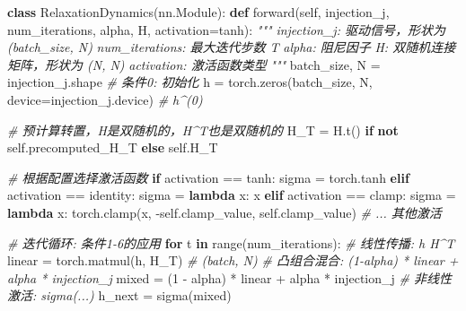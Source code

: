 \documentclass[
  12pt,
]{article}
\newenvironment{Shaded}{}{}
\newcommand{\BuiltInTok}[1]{#1}
\newcommand{\CommentTok}[1]{\textcolor[rgb]{0.38,0.63,0.69}{\textit{#1}}}
\newcommand{\ControlFlowTok}[1]{\textcolor[rgb]{0.00,0.44,0.13}{\textbf{#1}}}
\newcommand{\DecValTok}[1]{\textcolor[rgb]{0.25,0.63,0.44}{#1}}
\newcommand{\KeywordTok}[1]{\textcolor[rgb]{0.00,0.44,0.13}{\textbf{#1}}}
\newcommand{\NormalTok}[1]{#1}
\newcommand{\OperatorTok}[1]{\textcolor[rgb]{0.40,0.40,0.40}{#1}}
\newcommand{\StringTok}[1]{\textcolor[rgb]{0.25,0.44,0.63}{#1}}
\newcommand{\VariableTok}[1]{\textcolor[rgb]{0.10,0.09,0.49}{#1}}
\begin{document}
\begin{Shaded}
\begin{Highlighting}[]
\KeywordTok{class}\NormalTok{ RelaxationDynamics(nn.Module):}
    \KeywordTok{def}\NormalTok{ forward(}\VariableTok{self}\NormalTok{, injection\_j, num\_iterations, alpha, H, activation}\OperatorTok{=}\StringTok{\textquotesingle{}tanh\textquotesingle{}}\NormalTok{):}
        \CommentTok{"""}
\CommentTok{        injection\_j: 驱动信号，形状为 (batch\_size, N)}
\CommentTok{        num\_iterations: 最大迭代步数 T}
\CommentTok{        alpha: 阻尼因子}
\CommentTok{        H: 双随机连接矩阵，形状为 (N, N)}
\CommentTok{        activation: 激活函数类型}
\CommentTok{        """}
\NormalTok{        batch\_size, N }\OperatorTok{=}\NormalTok{ injection\_j.shape}
        \CommentTok{\# 条件0: 初始化}
\NormalTok{        h }\OperatorTok{=}\NormalTok{ torch.zeros(batch\_size, N, device}\OperatorTok{=}\NormalTok{injection\_j.device) }\CommentTok{\# h\^{}(0)}
        
        \CommentTok{\# 预计算转置，H是双随机的，H\^{}T也是双随机的}
\NormalTok{        H\_T }\OperatorTok{=}\NormalTok{ H.t() }\ControlFlowTok{if} \KeywordTok{not} \VariableTok{self}\NormalTok{.precomputed\_H\_T }\ControlFlowTok{else} \VariableTok{self}\NormalTok{.H\_T}
        
        \CommentTok{\# 根据配置选择激活函数}
        \ControlFlowTok{if}\NormalTok{ activation }\OperatorTok{==} \StringTok{\textquotesingle{}tanh\textquotesingle{}}\NormalTok{:}
\NormalTok{            sigma }\OperatorTok{=}\NormalTok{ torch.tanh}
        \ControlFlowTok{elif}\NormalTok{ activation }\OperatorTok{==} \StringTok{\textquotesingle{}identity\textquotesingle{}}\NormalTok{:}
\NormalTok{            sigma }\OperatorTok{=} \KeywordTok{lambda}\NormalTok{ x: x}
        \ControlFlowTok{elif}\NormalTok{ activation }\OperatorTok{==} \StringTok{\textquotesingle{}clamp\textquotesingle{}}\NormalTok{:}
\NormalTok{            sigma }\OperatorTok{=} \KeywordTok{lambda}\NormalTok{ x: torch.clamp(x, }\OperatorTok{{-}}\VariableTok{self}\NormalTok{.clamp\_value, }\VariableTok{self}\NormalTok{.clamp\_value)}
        \CommentTok{\# ... 其他激活}
        
        \CommentTok{\# 迭代循环: 条件1{-}6的应用}
        \ControlFlowTok{for}\NormalTok{ t }\KeywordTok{in} \BuiltInTok{range}\NormalTok{(num\_iterations):}
            \CommentTok{\# 线性传播: h H\^{}T}
\NormalTok{            linear }\OperatorTok{=}\NormalTok{ torch.matmul(h, H\_T) }\CommentTok{\# (batch, N)}
            \CommentTok{\# 凸组合混合: (1{-}alpha) * linear + alpha * injection\_j}
\NormalTok{            mixed }\OperatorTok{=}\NormalTok{ (}\DecValTok{1} \OperatorTok{{-}}\NormalTok{ alpha) }\OperatorTok{*}\NormalTok{ linear }\OperatorTok{+}\NormalTok{ alpha }\OperatorTok{*}\NormalTok{ injection\_j}
            \CommentTok{\# 非线性激活: sigma(...)}
\NormalTok{            h\_next }\OperatorTok{=}\NormalTok{ sigma(mixed)}
            

\end{Highlighting}
\end{Shaded}
\end{document}
